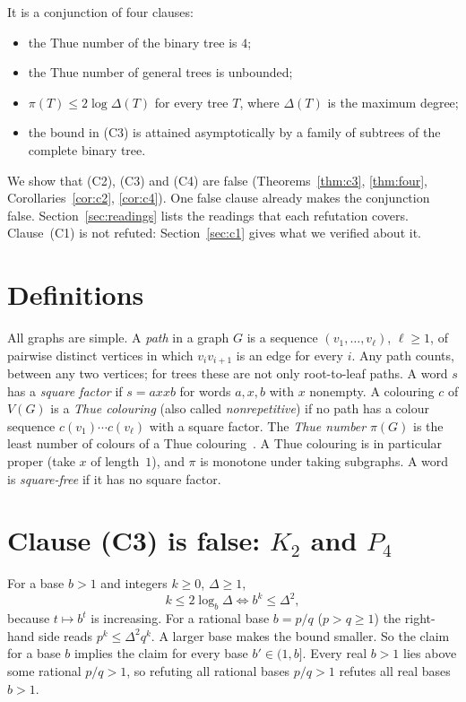 \documentclass[11pt]{article}
\theoremstyle{definition}
\theoremstyle{remark}
\begin{document}
It is a conjunction of four clauses:
\begin{itemize}
\item[(C1)] the Thue number of the binary tree is $4$;
\item[(C2)] the Thue number of general trees is unbounded;
\item[(C3)] $\pi(T)\le 2\log\Delta(T)$ for every tree $T$, where $\Delta(T)$ is the maximum degree;
\item[(C4)] the bound in (C3) is attained asymptotically by a family of subtrees of the complete
binary tree.
\end{itemize}
We show that (C2), (C3) and (C4) are false (Theorems~\ref{thm:c3}, \ref{thm:four},
Corollaries~\ref{cor:c2}, \ref{cor:c4}). One false clause already makes the conjunction false.
Section~\ref{sec:readings} lists the readings that each refutation covers. Clause~(C1) is not
refuted: Section~\ref{sec:c1} gives what we verified about it.

\section{Definitions}

All graphs are simple. A \emph{path} in a graph $G$ is a sequence $(v_1,\dots,v_\ell)$,
$\ell\ge1$, of pairwise distinct vertices in which $v_i v_{i+1}$ is an edge for every $i$. Any path
counts, between any two vertices; for trees these are not only root-to-leaf paths. A word $s$ has
a \emph{square factor} if $s=axxb$ for words $a,x,b$ with $x$ nonempty. A colouring $c$ of
$V(G)$ is a \emph{Thue colouring} (also called \emph{nonrepetitive}) if no path has a colour
sequence $c(v_1)\cdots c(v_\ell)$ with a square factor. The \emph{Thue number} $\pi(G)$ is the
least number of colours of a Thue colouring~\cite{AGHR}. A Thue colouring is in particular proper (take
$x$ of length~$1$), and $\pi$ is monotone under taking subgraphs. A word is \emph{square-free} if
it has no square factor.

\section{\texorpdfstring{Clause (C3) is false: $K_2$ and $P_4$}{Clause (C3) is false: K2 and P4}}

For a base $b>1$ and integers $k\ge0$, $\Delta\ge1$,
\begin{equation}\label{eq:log}
k\le 2\log_b\Delta \iff b^k\le\Delta^2 ,
\end{equation}
because $t\mapsto b^t$ is increasing. For a rational base $b=p/q$ ($p>q\ge1$) the right-hand side
reads $p^k\le \Delta^2q^k$. A larger base makes the bound smaller. So the claim for a base $b$
implies the claim for every base $b'\in(1,b]$. Every real $b>1$ lies above some rational
$p/q>1$, so refuting all rational bases $p/q>1$ refutes all real bases $b>1$.
\end{document}
